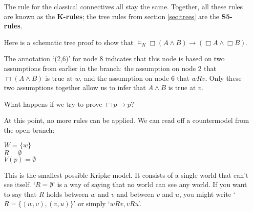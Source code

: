 The rule for the classical connectives all stay the same. Together,
all these rules are known as the \textbf{K-rules}; the tree rules from
section \ref{sec:trees} are the \textbf{S5-rules}.

Here is a schematic tree proof to show that
$\models_K \Box (A \land B) \to (\Box A \land \Box B)$.

\begin{center}
\end{center}
%
The annotation `(2,6)' for node 8 indicates that this node is based on two
assumptions from earlier in the branch: the assumption on node 2 that
$\Box (A \land B)$ is true at $w$, and the assumption on node 6 that $wRv$. Only
these two assumptions together allow us to infer that $A \land B$ is true at
$v$.

What happens if we try to prove $\Box p \to p$?

\begin{center}
\end{center}
%
At this point, no more rules can be applied. We can read off a countermodel from
the open branch:
\begin{center}
  $W = \{ w \}$\\
  $R = \emptyset$\\
  $V(p) = \emptyset$
\end{center}
This is the smallest possible Kripke model. It consists of a single world that
can't see itself. `$R = \emptyset$' is a way of saying that no world can see any
world. If you want to say that $R$ holds between $w$ and $v$ and between $v$ and
$u$, you might write `$R = \{ (w,v), (v,u) \}$' or simply `$wRv, vRu$'.

